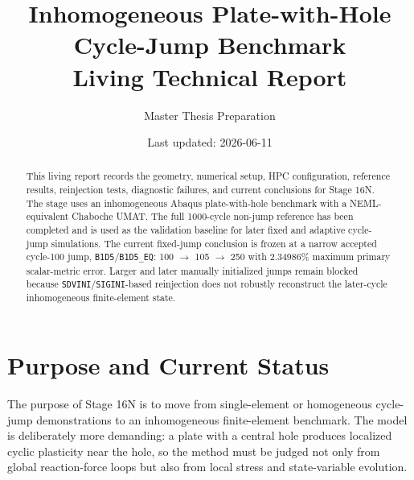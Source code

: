 \documentclass[11pt,a4paper]{article}
\title{\stage{} Inhomogeneous Plate-with-Hole Cycle-Jump Benchmark\\Living Technical Report}
\author{Master Thesis Preparation}
\date{Last updated: 2026-06-11}
\newcommand{\code}[1]{\texttt{#1}}
\newcommand{\stage}{Stage 16N}
\begin{document}
\maketitle

\begin{abstract}
This living report records the geometry, numerical setup, HPC configuration, reference results, reinjection tests, diagnostic failures, and current conclusions for \stage{}. The stage uses an inhomogeneous Abaqus plate-with-hole benchmark with a NEML-equivalent Chaboche UMAT. The full 1000-cycle non-jump reference has been completed and is used as the validation baseline for later fixed and adaptive cycle-jump simulations. The current fixed-jump conclusion is frozen at a narrow accepted cycle-100 jump, \code{B1D5}/\code{B1D5\_EQ}: 100 $\rightarrow$ 105 $\rightarrow$ 250 with 2.34986\% maximum primary scalar-metric error. Larger and later manually initialized jumps remain blocked because \code{SDVINI}/\code{SIGINI}-based reinjection does not robustly reconstruct the later-cycle inhomogeneous finite-element state.
\end{abstract}

\tableofcontents
\newpage

\section{Purpose and Current Status}

The purpose of \stage{} is to move from single-element or homogeneous cycle-jump demonstrations to an inhomogeneous finite-element benchmark. The model is deliberately more demanding: a plate with a central hole produces localized cyclic plasticity near the hole, so the method must be judged not only from global reaction-force loops but also from local stress and state-variable evolution.
\end{document}
